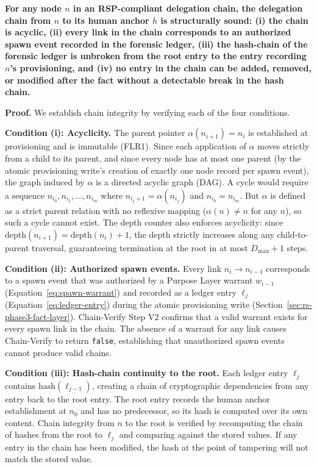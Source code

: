\begin{tcolorbox}[colback=blue!5, colframe=blue, title={Theorem 2 (Chain Integrity)}]
\textbf{For any node $n$ in an RSP-compliant delegation chain, the delegation chain from $n$ to its human anchor $h$ is structurally sound: (i) the chain is acyclic, (ii) every link in the chain corresponds to an authorized spawn event recorded in the forensic ledger, (iii) the hash-chain of the forensic ledger is unbroken from the root entry to the entry recording $n$'s provisioning, and (iv) no entry in the chain can be added, removed, or modified after the fact without a detectable break in the hash chain.}
\end{tcolorbox}

\medskip
\noindent\textbf{Proof.} We establish chain integrity by verifying each of the four conditions.

\medskip
\noindent\textbf{Condition (i): Acyclicity.} The parent pointer $\alpha(n_{i+1}) = n_i$ is established at provisioning and is immutable (FLR1). Since each application of $\alpha$ moves strictly from a child to its parent, and since every node has at most one parent (by the atomic provisioning write's creation of exactly one node record per spawn event), the graph induced by $\alpha$ is a directed acyclic graph (DAG). A cycle would require a sequence $n_{i_0}, n_{i_1}, \ldots, n_{i_m}$ where $n_{i_j+1} = \alpha(n_{i_j})$ and $n_{i_0} = n_{i_m}$. But $\alpha$ is defined as a strict parent relation with no reflexive mapping ($\alpha(n) \neq n$ for any $n$), so such a cycle cannot exist. The depth counter also enforces acyclicity: since $\text{depth}(n_{i+1}) = \text{depth}(n_i) + 1$, the depth strictly increases along any child-to-parent traversal, guaranteeing termination at the root in at most $D_{\max} + 1$ steps.

\medskip
\noindent\textbf{Condition (ii): Authorized spawn events.} Every link $n_i \rightarrow n_{i-1}$ corresponds to a spawn event that was authorized by a Purpose Layer warrant $w_{i-1}$ (Equation~\ref{eq:spawn-warrant}) and recorded as a ledger entry $\ell_j$ (Equation~\ref{eq:ledger-entry}) during the atomic provisioning write (Section~\ref{sec:rs-phase3-fact-layer}). Chain-Verify Step V2 confirms that a valid warrant exists for every spawn link in the chain. The absence of a warrant for any link causes Chain-Verify to return \texttt{false}, establishing that unauthorized spawn events cannot produce valid chains.

\medskip
\noindent\textbf{Condition (iii): Hash-chain continuity to the root.} Each ledger entry $\ell_j$ contains $\text{hash}(\ell_{j-1})$, creating a chain of cryptographic dependencies from any entry back to the root entry. The root entry records the human anchor establishment at $n_0$ and has no predecessor, so its hash is computed over its own content. Chain integrity from $n$ to the root is verified by recomputing the chain of hashes from the root to $\ell_j$ and comparing against the stored values. If any entry in the chain has been modified, the hash at the point of tampering will not match the stored value.

